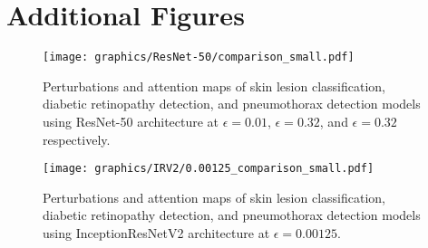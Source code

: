 \documentclass[10pt,twocolumn,letterpaper]{article}
\begin{document}
{\small


}

\clearpage
\appendix
  \section{Additional Figures}
    \begin{figure}[h!]
      \texttt{[image: graphics/ResNet-50/comparison\_small.pdf]}
      \caption{Perturbations and attention maps of skin lesion classification, diabetic retinopathy detection, and pneumothorax detection models using ResNet-50 architecture at $\epsilon=0.01$, $\epsilon=0.32$, and $\epsilon=0.32$ respectively.}
      \label{ResNet50Comparison}
    \end{figure}
    \clearpage
    \begin{figure}[h!]
      \texttt{[image: graphics/IRV2/0.00125\_comparison\_small.pdf]}
      \caption{Perturbations and attention maps of skin lesion classification, diabetic retinopathy detection, and pneumothorax detection models using InceptionResNetV2 architecture at $\epsilon=0.00125$.}
      \label{IRV2Comparison}
    \end{figure}
\end{document}
